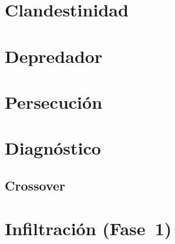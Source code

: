 \documentclass[11pt,a5paper]{book}
\begin{document}
\chapter{Clandestinidad}\label{chapter:clandestinidad}


\chapter{Depredador}\label{chapter:depredador}


\chapter{Persecución}\label{chapter:persecucion}


\chapter{Diagnóstico}\label{chapter:diagnostico}


\begin{appendices}
\renewcommand{\thechapter}{\arabic{chapter}}
\chapter{Crossover}\label{appendix:crossover}

\end{appendices}

\chapter{Infiltración (Fase~1)}\label{chapter:infiltracion-fase_1}

\end{document}
